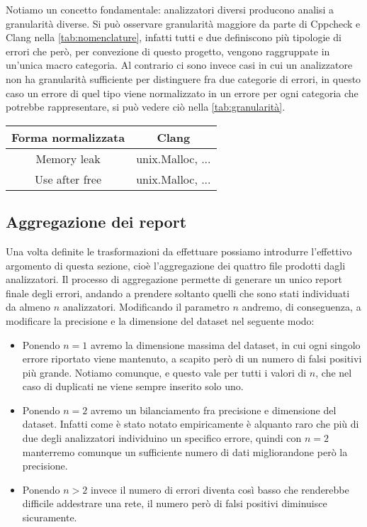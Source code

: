 Notiamo un concetto fondamentale: analizzatori diversi producono analisi a granularità diverse. 
Si può osservare granularità maggiore da parte di Cppcheck e Clang nella \autoref{tab:nomenclature}, infatti tutti e due definiscono più tipologie di errori che però, per convezione di questo progetto, vengono raggruppate in un'unica macro categoria.
Al contrario ci sono invece casi in cui un analizzatore non ha granularità sufficiente per distinguere fra due categorie di errori, in questo caso un errore di quel tipo viene normalizzato in un errore per ogni categoria che potrebbe rappresentare, si può vedere ciò nella \autoref{tab:granularità}. 

\begin{center}
  \begin{tabular}{|c|c|}
    \hline
    Forma normalizzata & Clang  \\
    \hline
    Memory leak  &  unix.Malloc, ... \\
    \hline
    Use after free & unix.Malloc, ... \\
    \hline
  \end{tabular}
   \label{tab:granularità}
\end{center} 


\subsection{Aggregazione dei report}
Una volta definite le trasformazioni da effettuare possiamo introdurre l'effettivo argomento di questa sezione, cioè l'aggregazione dei quattro file prodotti dagli analizzatori.
Il processo di aggregazione permette di generare un unico report finale degli errori, andando a prendere soltanto quelli che sono stati individuati da almeno $n$ analizzatori. 
Modificando il parametro $n$ andremo, di conseguenza, a modificare la precisione e la dimensione del dataset nel seguente modo:
  \begin{itemize}
    \item Ponendo $n=1$ avremo la dimensione massima del dataset, in cui ogni singolo errore riportato viene mantenuto, a scapito però di un numero di falsi positivi più grande.
          Notiamo comunque, e questo vale per tutti i valori di $n$, che nel caso di duplicati ne viene sempre inserito solo uno.
    \item Ponendo $n=2$ avremo un bilanciamento fra precisione e dimensione del dataset. Infatti come è stato notato empiricamente è alquanto raro che più di due degli analizzatori individuino un specifico errore,
          quindi con $n=2$ manterremo comunque un sufficiente numero di dati migliorandone però la precisione.
    \item Ponendo $n>2$ invece il numero di errori diventa così basso che renderebbe difficile addestrare una rete, il numero però di falsi positivi diminuisce sicuramente.
  \end{itemize}

